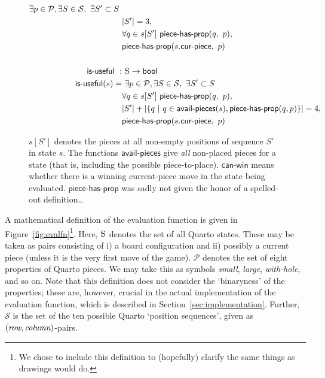 \documentclass[a4paper,9pt]{article}
\begin{document}
\begin{figure}[h!]
\begin{framed}
{\begin{align*}
    \exists p \in \mathcal{P},
    \exists S \in \mathcal{S},~
    \exists S' \subset S~ \\
      & |S'| = 3, \\
      & \forall q \in s[S']~\textsf{piece-has-prop}(q,~p),\\
      & \textsf{piece-has-prop}(s.\textsf{cur-piece},~p) \\
  \\
  \textsf{is-useful}~:&~\textsc{S} \rightarrow \textsf{bool} \\
  \textsf{is-useful}(s) =&~
    \exists p \in \mathcal{P},
    \exists S \in \mathcal{S},~
    \exists S' \subset S~ \\
      & \forall q \in s[S']~\textsf{piece-has-prop}(q,~p),\\
      & |S'| + |\{ q~|~q \in \textsf{avail-pieces}(s), 
                             \textsf{piece-has-prop}(q, p) \}| = 4, \\
      & \textsf{piece-has-prop}(s.\textsf{cur-piece},~p)
\end{align*}
}

{ \footnotesize
$s[S']$ denotes the pieces at all non-empty positions of sequence $S'$ in state
$s$.  The functions $\textsf{avail-pieces}$ give \emph{all} non-placed pieces
for a state (that is, including the possible piece-to-place).
$\textsf{can-win}$ means whether there is a winning current-piece move in the
state being evaluated.  $\textsf{piece-has-prop}$ was sadly not given the
honor of a spelled-out definition\ldots
}
\end{framed}
\end{figure}

A mathematical definition of the evaluation function is given in
Figure~\ref{fig:evalfn}\footnote{We chose to include this definition to
(hopefully) clarify the same things as drawings would do.}. Here, $\textsc{S}$
denotes
the set of all Quarto states. These may be taken as pairs consisting of i) a
board configuration and ii) possibly a current piece (unless it is the very
first move of the game).  $\mathcal{P}$ denotes the set of eight properties of
Quarto pieces. We may take this as symbols \emph{small}, \emph{large},
\emph{with-hole}, and so on. Note that this definition does not consider the
`binaryness' of the properties; these are, however, crucial in the actual
implementation of the evaluation function, which is described in
Section~\ref{sec:implementation}.  Further, $\mathcal{S}$ is the set of the ten
possible Quarto `position sequences', given as $(\emph{row},
\emph{column})$-pairs. 
\end{document}
